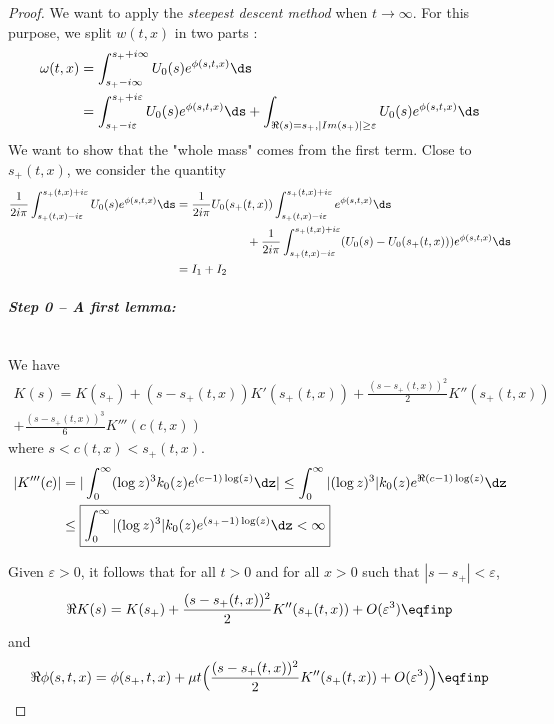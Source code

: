 \begin{proof}
We want to apply the \textit{steepest descent method} \cite{debye1909naherungsformeln} when $t \to \infty$. For this purpose, we split $w(t,x)$ in two parts : 
\begin{align*}
    \omega(t,x)
        &= \int_{s_+-i\infty}^{s_++i\infty} U_0(s)e^{\phi(s, t, x)} \ds \\
        &= \int_{s_+-i\varepsilon}^{s_++i\varepsilon} U_0(s) e^{\phi(s, t, x)} \ds 
        +\int_{\Re(s) = s_+, |Im(s_+)| \geq \varepsilon} U_0(s) e^{\phi(s, t, x)} \ds \\
\end{align*}
We want to show that the "whole mass" comes from the first term. Close to $s_+(t,x)$, we consider the quantity
    \begin{align*}
    \frac{1}{2i \pi} \int_{s_+(t,x) - i\varepsilon}^{s_+(t,x) + i\varepsilon} U_0(s) e^{\phi(s,t,x)} \ds 
    &=
    \frac{1}{2i \pi} U_0(s_+(t,x)) \int_{s_+(t,x) - i\varepsilon}^{s_+(t,x) + i\varepsilon} e^{\phi(s,t,x)} \ds
    \\
    & \qquad \qquad \qquad+ 
    \frac{1}{2i \pi} \int_{s_+(t,x) - i\varepsilon}^{s_+(t,x) + i\varepsilon} (U_0(s) -  U_0(s_+(t,x)))  e^{\phi(s,t,x)} \ds \\
    &= I_1 + I_2
    \end{align*}

\paragraph{\textit{Step 0 -- A first lemma:}}\mbox{}\\
We have
\begin{equation}
    \begin{split}
    K(s) = K(s_+) + (s - s_+(t,x)) K'(s_+(t,x)) + \frac{(s - s_+(t,x))^2}{2} K''(s_+(t,x)) \\+ \frac{(s - s_+(t,x))^3}{6} K'''(c(t,x))
    \end{split}
\end{equation}
where $s < c(t,x) < s_+(t,x)$.
    \begin{align*}
         |K'''(c)|
         &= |\int_0^\infty (\log z)^3 k_0(z) e^{(c-1)\log(z)}\dz|
         \leq \int_0^\infty |(\log z)^3| k_0(z)  e^{\Re (c-1)\log(z)}\dz \\
         &\leq  \boxed{\int_0^\infty |(\log z)^3| k_0(z)  e^{(s_+-1)\log(z)}\dz < \infty}
    \end{align*}
    
Given $\varepsilon > 0$, it follows that for all $t > 0$ and for all $x>0$ such that $|s - s_+| < \varepsilon$, 
    \begin{equation}
        \begin{split}
        \Re K(s) = K(s_+) + \frac{(s - s_+(t,x))^2}{2} K''(s_+(t,x)) + O(\varepsilon^3)
        \eqfinp
        \end{split}
    \end{equation}
and 
    \begin{equation}
        \Re \phi(s, t, x) = \phi(s_+, t, x) + \mu t \Big(\frac{(s - s_+(t,x))^2}{2} K''(s_+(t,x)) + O(\varepsilon^3)\Big)
        \eqfinp
    \end{equation}
\medskip


\end{proof}
